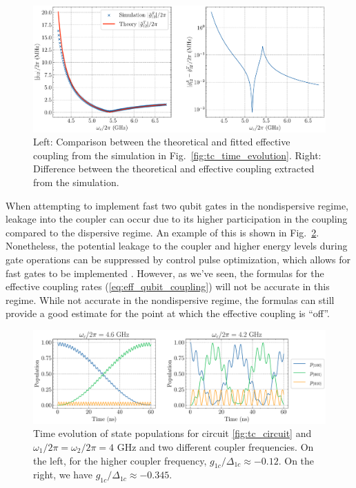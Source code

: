 \begin{figure}[!h]
    \centering
    \includegraphics[width=\textwidth]{figures/TC_sim_th_eff_coupling.pdf}
    \caption{Left: Comparison between the theoretical and fitted effective coupling from the simulation in Fig.\ \ref{fig:tc_time_evolution}. Right: Difference between the theoretical and effective coupling extracted from the simulation.}
    \label{fig:eff_vs_sim_coupling}
\end{figure}

When attempting to implement fast two qubit gates in the nondispersive regime, leakage into the coupler can occur due to its higher participation in the coupling compared to the dispersive regime. An example of this is shown in Fig.\ \ref{fig:tc_time_evolve_example}. Nonetheless, the potential leakage to the coupler and higher energy levels during gate operations can be suppressed by control pulse optimization, which allows for fast gates to be implemented \cite{high_fidelity_cz_iswap_tc}. However, as we've seen, the formulas for the effective coupling rates (\ref{eq:eff_qubit_coupling}) will not be accurate in this regime. While not accurate in the nondispersive regime, the formulas can still provide a good estimate for the point at which the effective coupling is ``off''.

\begin{figure}[!h]
    \centering
    \includegraphics[width=\textwidth]{figures/TC_time_evolution_examples.pdf}
    \caption{Time evolution of state populations for circuit \ref{fig:tc_circuit} and $\omega_1/2\pi=\omega_2/2\pi=4$ GHz and two different coupler frequencies. On the left, for the higher coupler frequency, $g_{1c}/\Delta_{1c} \approx -0.12$. On the right, we have $g_{1c}/\Delta_{1c} \approx -0.345$.}
    \label{fig:tc_time_evolve_example}
\end{figure}


